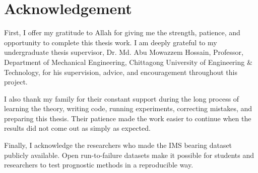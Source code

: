 \chapter*{Acknowledgement}

\noindent First, I offer my gratitude to Allah for giving me the strength, patience, and opportunity to complete this thesis work. I am deeply grateful to my undergraduate thesis supervisor, Dr. Md. Abu Mowazzem Hossain, Professor, Department of Mechanical Engineering, Chittagong University of Engineering \& Technology, for his supervision, advice, and encouragement throughout this project.

I also thank my family for their constant support during the long process of learning the theory, writing code, running experiments, correcting mistakes, and preparing this thesis. Their patience made the work easier to continue when the results did not come out as simply as expected.

Finally, I acknowledge the researchers who made the IMS bearing dataset publicly available. Open run-to-failure datasets make it possible for students and researchers to test prognostic methods in a reproducible way.
